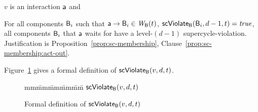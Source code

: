  \en

\item $v$ is an interaction $\mathsf{a}$ and
   \bn

   \item \label{def:supercycle.violation.interaction.out}
         For all components $\mathsf{B}_i$ such that $\mathsf{a} \rightarrow \mathsf{B}_i \in \mathit{W}_{\mathsf{B}}({t})$, $\mathsf{scViolate}_{\mathsf{B}}(\mathsf{B}_i,d-1,t) = \mathit{true}$,
         \ie all components $\mathsf{B}_i$ that $\mathsf{a}$ waits for have a level-$(d-1)$ supercycle-violation.
    Justification is Proposition~\ref{prop:sc-membership}, Clause~\ref{prop:sc-membership:act-out}.


   \en

\en

Figure~\ref{fig:scViolate} gives a formal definition of $\mathsf{scViolate}_{\mathsf{B}}(v,d,t)$.
\ed


\begin{figure}[ht]

\setcounter{lctr}{0}
\begin{tabbing}\label{alg:check-scViol}
mm\= mm\= mm\= mm\= mm\=\kill
$\mathsf{scViolate}_{\mathsf{B}}(v,d,t)$\\
   \lit{\FI}
\lio{\FI}


   \lit{\ELSE\ \RETURNE{\fff}}
   \lit{\FI}
\lio{\FI}

   \lit{\ELSE\ \RETURNE{\fff}}
   \lit{\FI}
\lio{\FI}
\end{tabbing}
\vspace{-4ex}
\caption{Formal definition of $\mathsf{scViolate}_{\mathsf{B}}(v,d,t)$}
\label{fig:scViolate}
\end{figure}



